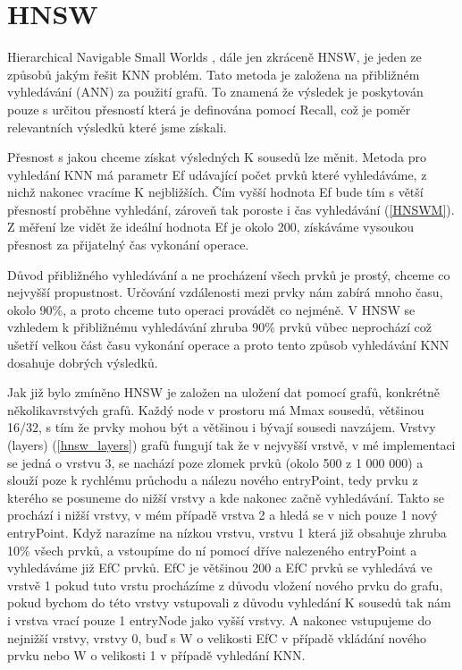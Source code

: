 \documentclass[czech,semestral,dept460,male,csharp,cpdeclaration]{diploma}
\begin{document}
	\chapter{HNSW}
	
		Hierarchical Navigable Small Worlds \cite{malkov2018efficient}, dále jen zkráceně HNSW, je jeden ze způsobů jakým řešit KNN problém. Tato metoda je založena na přibližném vyhledávání (ANN) za použití grafů. To znamená že výsledek je poskytován pouze s určitou přesností která je definována pomocí Recall, což je poměr relevantních výsledků které jsme získali.
		
		Přesnost s jakou chceme získat výsledných K sousedů lze měnit. Metoda pro vyhledání KNN má parametr Ef udávající počet prvků které vyhledáváme, z nichž nakonec vracíme K nejbližších. Čím vyšší hodnota Ef bude tím s větší přesností proběhne vyhledání, zároveň tak poroste i čas vyhledávání (\ref{HNSWM}). Z měření lze vidět že ideální hodnota Ef je okolo 200, získáváme vysoukou přesnost za přijatelný čas vykonání operace.
		
		Důvod přibližného vyhledávání a ne procházení všech prvků je prostý, chceme co nejvyšší propustnost. Určování vzdálenosti mezi prvky nám zabírá mnoho času, okolo 90\%, a proto chceme tuto operaci provádět co nejméně. V HNSW se vzhledem k přibližnému vyhledávání zhruba 90\% prvků vůbec neprochází což ušetří velkou část času vykonání operace a proto tento způsob vyhledávání KNN dosahuje dobrých výsledků.
		
		Jak již bylo zmíněno HNSW je založen na uložení dat pomocí grafů, konkrétně několikavrstvých grafů. Každý node v prostoru má Mmax sousedů, většinou 16/32, s tím že prvky mohou být a většinou i bývají sousedi navzájem. Vrstvy (layers) (\ref{hnsw_layers}) grafů fungují tak že v nejvyšší vrstvě, v mé implementaci se jedná o vrstvu 3, se nachází poze zlomek prvků (okolo 500 z 1 000 000) a slouží poze k rychlému průchodu a nálezu nového entryPoint, tedy prvku z kterého se posuneme do nižší vrstvy a kde nakonec začně vyhledávání. Takto se prochází i nižší vrstvy, v mém případě vrstva 2 a hledá se v nich pouze 1 nový entryPoint. Když narazíme na nízkou vrstvu, vrstvu 1 která již obsahuje zhruba 10\% všech prvků, a vstoupíme do ní pomocí dříve nalezeného entryPoint a vyhledáváme již EfC prvků. EfC je většinou 200 a EfC prvků se vyhledává ve vrstvě 1 pokud tuto vrstu procházíme z důvodu vložení nového prvku do grafu, pokud bychom do této vrstvy vstupovali z důvodu vyhledání K sousedů tak nám i vrstva vrací pouze 1 entryNode jako vyšší vrstvy. A nakonec vstupujeme do nejnižší vrstvy, vrstvy 0, buď s W o velikosti EfC v případě vkládání nového prvku nebo W o velikosti 1 v případě vyhledání KNN.
		
\end{document}
